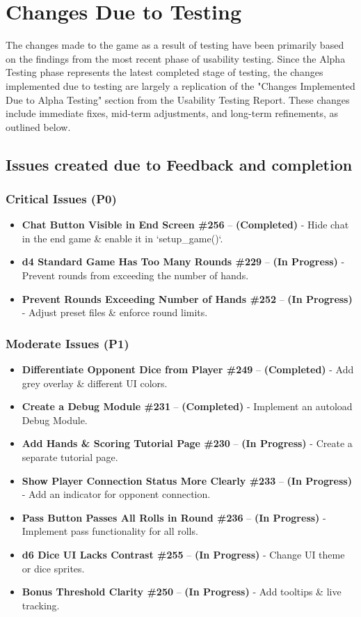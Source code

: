 \documentclass[12pt, titlepage]{article}
\begin{document}
\newpage
\section{Changes Due to Testing}

The changes made to the game as a result of testing have been primarily based on the findings from the most recent phase of usability testing. Since the Alpha Testing phase represents the latest completed stage of testing, the changes implemented due to testing are largely a replication of the "Changes Implemented Due to Alpha Testing" section from the Usability Testing Report. These changes include immediate fixes, mid-term adjustments, and long-term refinements, as outlined below.

\subsection{Issues created due to Feedback and completion}

\subsubsection{Critical Issues (P0)}
\begin{itemize}
    \item \textbf{Chat Button Visible in End Screen \#256} – \textbf{(Completed)} - Hide chat in the end game \& enable it in `setup\_game()`.
    \item \textbf{d4 Standard Game Has Too Many Rounds \#229} – \textbf{(In Progress)} - Prevent rounds from exceeding the number of hands.
    \item \textbf{Prevent Rounds Exceeding Number of Hands \#252} – \textbf{(In Progress)} - Adjust preset files \& enforce round limits.
\end{itemize}

\subsubsection{Moderate Issues (P1)}
\begin{itemize}
    \item \textbf{Differentiate Opponent Dice from Player \#249} – \textbf{(Completed)} - Add grey overlay \& different UI colors.
    \item \textbf{Create a Debug Module \#231} – \textbf{(Completed)} - Implement an autoload Debug Module.
    \item \textbf{Add Hands \& Scoring Tutorial Page \#230} – \textbf{(In Progress)} - Create a separate tutorial page.
    \item \textbf{Show Player Connection Status More Clearly \#233} – \textbf{(In Progress)} - Add an indicator for opponent connection.
    \item \textbf{Pass Button Passes All Rolls in Round \#236} – \textbf{(In Progress)} - Implement pass functionality for all rolls.
    \item \textbf{d6 Dice UI Lacks Contrast \#255} – \textbf{(In Progress)} - Change UI theme or dice sprites.
    \item \textbf{Bonus Threshold Clarity \#250} – \textbf{(In Progress)} - Add tooltips \& live tracking.
\end{itemize}
\end{document}
